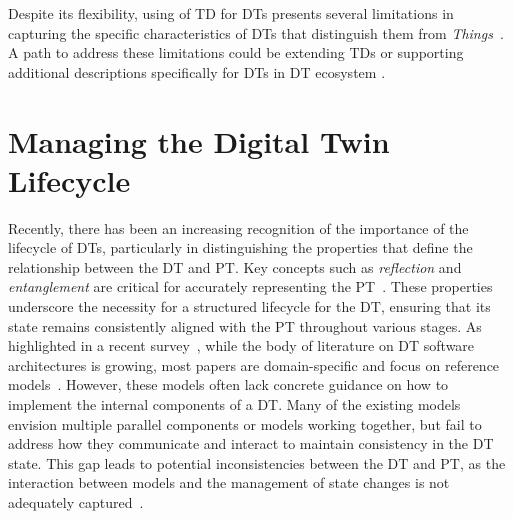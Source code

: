 Despite its flexibility,
using of \ac{TD} for \acp{DT} presents several limitations in capturing the specific characteristics of \acp{DT} that distinguish them from \emph{Things}~\cite{burattini2024models}.
A path to address these limitations could be extending \acp{TD} or supporting additional descriptions specifically for \acp{DT} in \ac{DT} ecosystem \cite{giulianelli2024models}.



\section{Managing the Digital Twin Lifecycle}


Recently, there has been an increasing recognition of the importance of the lifecycle of \acp{DT}, particularly in distinguishing the properties that define the relationship between the \ac{DT} and \ac{PT}. Key concepts such as \emph{reflection} and \emph{entanglement} are critical for accurately representing the \ac{PT}~\cite{dt-IoT-context-Minerva-2020, web_of_dt}. These properties underscore the necessity for a structured lifecycle for the \ac{DT}, ensuring that its state remains consistently aligned with the \ac{PT} throughout various stages. As highlighted in a recent survey~\cite{ferko2022architecting, 9640612, HRIBERNIK2021103508}, while the body of literature on \ac{DT} software architectures is growing, most papers are domain-specific and focus on reference models~\cite{1999daglib}. However, these models often lack concrete guidance on how to implement the internal components of a \ac{DT}. Many of the existing models envision multiple parallel components or models working together, but fail to address how they communicate and interact to maintain consistency in the \ac{DT} state. This gap leads to potential inconsistencies between the \ac{DT} and \ac{PT}, as the interaction between models and the management of state changes is not adequately captured~\cite{alam2017access,Malakuti2019fourlayer,Lpez2021}.

